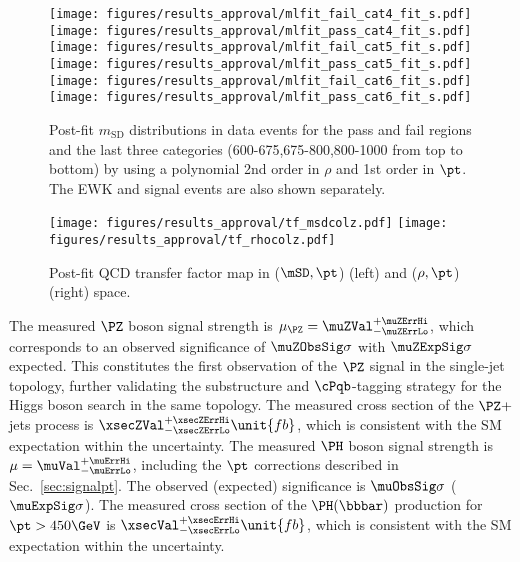 \begin{figure}[hbtp]
\centering
    \texttt{[image: figures/results\_approval/mlfit\_fail\_cat4\_fit\_s.pdf]}
    \texttt{[image: figures/results\_approval/mlfit\_pass\_cat4\_fit\_s.pdf]}\\
    \texttt{[image: figures/results\_approval/mlfit\_fail\_cat5\_fit\_s.pdf]}
    \texttt{[image: figures/results\_approval/mlfit\_pass\_cat5\_fit\_s.pdf]}\\
    \texttt{[image: figures/results\_approval/mlfit\_fail\_cat6\_fit\_s.pdf]}
    \texttt{[image: figures/results\_approval/mlfit\_pass\_cat6\_fit\_s.pdf]}\\
 \caption{Post-fit $m_{\mathrm{SD}}$ distributions in data events for the
      pass and fail regions and the last three \pt categories (600-675,675-800,800-1000 from top to bottom) by using a
      polynomial 2nd order in $\rho$ and 1st order in $\pt$. The EWK and
      signal events are also shown separately.  }
 \label{fig:fitdata1}
 \end{figure}


\begin{figure}[hbtp]
\centering
    \texttt{[image: figures/results\_approval/tf\_msdcolz.pdf]}
    \texttt{[image: figures/results\_approval/tf\_rhocolz.pdf]}
    \caption{Post-fit QCD transfer factor map in ($\mSD,\pt$) (left)
      and ($\rho,\pt$) (right) space.  }
 \label{fig:qcdTF}
 \end{figure}

\clearpage


The measured $\PZ$ boson signal strength is $\mu_\PZ =\muZVal_{-\muZErrLo}^{+\muZErrHi}$,  which corresponds to an observed significance of $\muZObsSig\sigma$ with $\muZExpSig\sigma$ expected. This constitutes the first observation of the $\PZ$ signal in the single-jet topology, further validating the substructure and $\cPqb$-tagging strategy for the Higgs boson search in the same topology. The measured cross section of the $\PZ+$jets process is $\xsecZVal_{-\xsecZErrLo}^{+\xsecZErrHi}\unit{fb}$, which is consistent with the SM expectation within the uncertainty. The measured $\PH$ boson signal strength is $\mu=\muVal_{-\muErrLo}^{+\muErrHi}$, including the $\pt$ corrections described in Sec.~\ref{sec:signalpt}.  The observed (expected) significance is $\muObsSig\sigma$ ($\muExpSig\sigma$). The measured cross section of the $\PH(\bbbar)$ production for $\pt>450\GeV$ is $\xsecVal_{-\xsecErrLo}^{+\xsecErrHi}\unit{fb}$, which is consistent with the SM expectation within the uncertainty.


